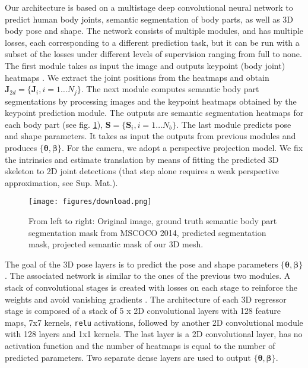 \documentclass[runningheads]{llncs}
\newcommand{\thetab}{\bm{\theta}}
\newcommand{\betab}{\bm{\beta}}
\begin{document}
Our architecture is based on a multistage deep convolutional neural network to predict human body joints, semantic segmentation of body parts, as well as 3D body pose and shape. The network consists of multiple modules, and has multiple losses, each corresponding to a different prediction task, but it can be run with a subset of the losses under different levels of supervision ranging from full to none. The first module takes as input the image and outputs keypoint (body joint) heatmaps \cite{Cao2017paf2d}. We extract the joint positions from the heatmaps and obtain $\mathbf{J}_{2d} = \{ \mathbf{J}_{i}, i=1 \ldots N_{j} \}$. The next module computes semantic body part segmentations by processing images and the keypoint heatmaps obtained by the keypoint prediction module. The outputs are semantic segmentation heatmaps for each body part (see fig. \ref{fig:segmentation}), $\mathbf{S} = \{\mathbf{S}_{i}, i=1 \ldots N_{b} \}$. The last module predicts pose and shape parameters. It takes as input the outputs from previous modules and produces $\{\thetab,\betab\}$. For the camera, we adopt a perspective projection model. We fix the intrinsics and estimate translation by means of fitting the predicted 3D skeleton to 2D joint detections (that step alone requires a weak perspective approximation, see Sup. Mat.).

\begin{figure}[h!]
\begin{center}
    \texttt{[image: figures/download.png]}
\end{center}
\caption{\small From left to right: Original image, ground truth semantic body part segmentation mask from MSCOCO 2014, predicted segmentation mask, projected semantic mask of our 3D mesh.}
\label{fig:segmentation}
\end{figure}    

The goal of the 3D pose layers is to predict the pose and shape parameters $\{\thetab, \betab\}$. The associated network is similar to the ones of the previous two modules. A stack of convolutional stages is created with losses on each stage to reinforce the weights and avoid vanishing gradients  \cite{wei2016cpm,Cao2017paf2d}. The architecture of each 3D regressor stage is composed of a stack of 5 x 2D convolutional layers with 128 feature maps, 7x7 kernels, \verb|relu| activations, followed by another 2D convolutional module with 128 layers and  1x1 kernels. The last layer is a 2D convolutional layer, has no activation function and the number of heatmaps is equal to the number of predicted parameters. Two separate dense layers are used to output $\{\thetab, \betab\}$.
\end{document}
